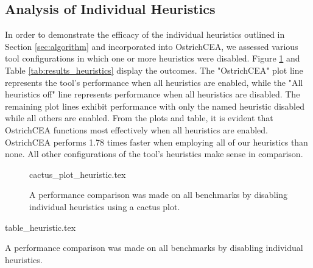 \documentclass{standalone}
\begin{document}
\subsection{Analysis of Individual Heuristics}
In order to demonstrate the efficacy of the individual heuristics outlined in Section \ref{sec:algorithm} and incorporated into OstrichCEA, we assessed various tool configurations in which one or more heuristics were disabled. Figure \ref{fig:cactus_heuristics} and Table \ref{tab:results_heuristics} display the outcomes. The "OstrichCEA" plot line represents the tool's performance when all heuristics are enabled, while the "All heuristics off" line represents performance when all heuristics are disabled. The remaining plot lines exhibit performance with only the named heuristic disabled while all others are enabled. From the plots and table, it is evident that OstrichCEA functions most effectively when all heuristics are enabled. OstrichCEA performs 1.78 times faster when employing all of our heuristics than none. All other configurations of the tool's heuristics make sense in comparison.
\begin{figure}
  {cactus_plot_heuristic.tex}
  \caption{A performance comparison was made on all benchmarks by disabling individual heuristics using a cactus plot.}
  \label{fig:cactus_heuristics}
\end{figure}
\begin{table}
  {table_heuristic.tex}
  \caption{A performance comparison was made on all benchmarks by disabling individual heuristics.}
  \label{tab:results_heuristics}
\end{table}
\end{document}
